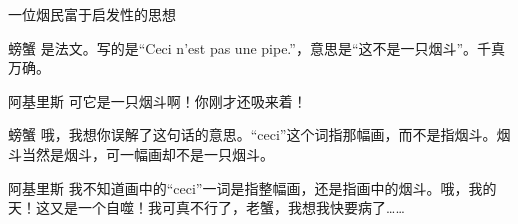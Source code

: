 \begin{dialog}{一位烟民富于启发性的思想}
\begin{dialogue}
\item[螃蟹]是法文。写的是“Ceci n'est pas une pipe.”，意思是“这不是一只烟斗”。千真万确。

\item[阿基里斯]可它是一只烟斗啊！你刚才还吸来着！

\item[螃蟹]哦，我想你误解了这句话的意思。“ceci”这个词指那幅画，而不是指烟斗。烟斗当然是烟斗，可一幅画却不是一只烟斗。

\item[阿基里斯]我不知道画中的“ceci”一词是指整幅画，还是指画中的烟斗。哦，我的天！这又是一个自噬！我可真不行了，老蟹，我想我快要病了……

\end{dialogue}

\end{dialog}
